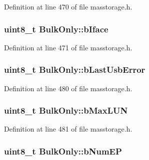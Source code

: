 \-Definition at line 470 of file masstorage.\-h.

\hypertarget{class_bulk_only_ac18ad598cd9a1ee99f49d51a572a50a4}{
\subsubsection[{b\-Iface}]{\setlength{\rightskip}{0pt plus 5cm}uint8\-\_\-t {\bf \-Bulk\-Only\-::b\-Iface}}}\label{class_bulk_only_ac18ad598cd9a1ee99f49d51a572a50a4}


\-Definition at line 471 of file masstorage.\-h.

\hypertarget{class_bulk_only_a20ff3cc4bb15c557f57a8c6200b412d1}{
\subsubsection[{b\-Last\-Usb\-Error}]{\setlength{\rightskip}{0pt plus 5cm}uint8\-\_\-t {\bf \-Bulk\-Only\-::b\-Last\-Usb\-Error}}}\label{class_bulk_only_a20ff3cc4bb15c557f57a8c6200b412d1}


\-Definition at line 480 of file masstorage.\-h.

\hypertarget{class_bulk_only_a6bbdd41bf6efc4060f3c36da7d6ed8b2}{
\subsubsection[{b\-Max\-L\-U\-N}]{\setlength{\rightskip}{0pt plus 5cm}uint8\-\_\-t {\bf \-Bulk\-Only\-::b\-Max\-L\-U\-N}}}\label{class_bulk_only_a6bbdd41bf6efc4060f3c36da7d6ed8b2}


\-Definition at line 481 of file masstorage.\-h.

\hypertarget{class_bulk_only_a6cb56ebd0307845321340919e2b35952}{
\subsubsection[{b\-Num\-E\-P}]{\setlength{\rightskip}{0pt plus 5cm}uint8\-\_\-t {\bf \-Bulk\-Only\-::b\-Num\-E\-P}}}\label{class_bulk_only_a6cb56ebd0307845321340919e2b35952}


